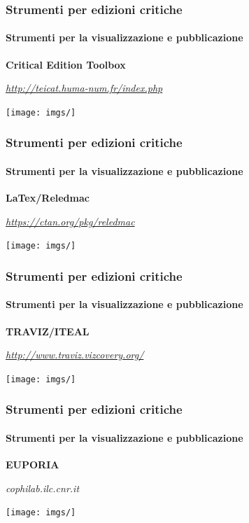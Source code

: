 \begin{frame}
    \frametitle{Strumenti per edizioni critiche}
    \framesubtitle{Strumenti per la visualizzazione e pubblicazione}
	\addtocounter{nframe}{1}
    \begin{center}
        \textbf{Critical Edition Toolbox}
    \end{center}
    \begin{center}
        \textit{\url{http://teicat.huma-num.fr/index.php}}
	\end{center}
    \begin{center}
        \texttt{[image: imgs/]}
	\end{center}
\end{frame}

\begin{frame}
    \frametitle{Strumenti per edizioni critiche}
    \framesubtitle{Strumenti per la visualizzazione e pubblicazione}
	\addtocounter{nframe}{1}
    \begin{center}
        \textbf{LaTex/Reledmac}
    \end{center}
    \begin{center}
        \textit{\url{https://ctan.org/pkg/reledmac}}
	\end{center}
    \begin{center}
        \texttt{[image: imgs/]}
	\end{center}
\end{frame}

\begin{frame}
    \frametitle{Strumenti per edizioni critiche}
    \framesubtitle{Strumenti per la visualizzazione e pubblicazione}
	\addtocounter{nframe}{1}
    \begin{center}
        \textbf{TRAVIZ/ITEAL}
    \end{center}
    \begin{center}
        \textit{\url{http://www.traviz.vizcovery.org/}}
	\end{center}
    \begin{center}
        \texttt{[image: imgs/]}
	\end{center}
\end{frame}

\begin{frame}
    \frametitle{Strumenti per edizioni critiche}
    \framesubtitle{Strumenti per la visualizzazione e pubblicazione}
	\addtocounter{nframe}{1}
    \begin{center}
        \textbf{EUPORIA}
    \end{center}
    \begin{center}
        \textit{cophilab.ilc.cnr.it}
	\end{center}
    \begin{center}
        \texttt{[image: imgs/]}
	\end{center}
\end{frame}
